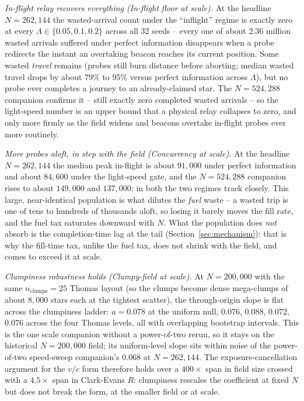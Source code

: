 \emph{In-flight relay recovers everything (In-flight floor at scale).} At the headline $N = 262{,}144$
the wasted-arrival count under the ``inflight'' regime is exactly zero at every
$\Lambda \in \{0.05, 0.1, 0.2\}$ across all 32 seeds -- every one of about 2.36 million wasted
arrivals suffered under perfect information disappears when a probe redirects the instant an
overtaking beacon reaches its current position. Some wasted \emph{travel} remains (probes still burn
distance before aborting; median wasted travel drops by about 79\% to 95\% versus perfect information
across $\Lambda$), but no probe ever completes a journey to an already-claimed star. The
$N = 524{,}288$ companion confirms it -- still exactly zero completed wasted arrivals -- so the
light-speed number is an upper bound that a physical relay collapses to zero, and only more firmly as
the field widens and beacons overtake in-flight probes ever more routinely.

\emph{More probes aloft, in step with the field (Concurrency at scale).} At the headline
$N = 262{,}144$ the median peak in-flight is about $91{,}000$ under perfect information and about
$84{,}600$ under the light-speed gate, and the $N = 524{,}288$ companion rises to about $149{,}000$
and $137{,}000$; in both the two regimes track closely. This large, near-identical population is what
dilutes the \emph{fuel} waste -- a wasted trip is one of tens to hundreds of thousands aloft, so
losing it barely moves the fill rate, and the fuel tax saturates downward with $N$. What the
population does \emph{not} absorb is the completion-time lag at the tail (Section~\ref{sec:mechanism}):
that is why the fill-time tax, unlike the fuel tax, does not shrink with the field, and comes to
exceed it at scale.

\emph{Clumpiness robustness holds (Clumpy-field at scale).} At $N = 200{,}000$ with the same
$n_{\text{clumps}} = 25$ Thomas layout (so the clumps become dense mega-clumps of about
$8{,}000$ stars each at the tightest scatter), the through-origin slope is flat across the
clumpiness ladder: $a = 0.078$ at the uniform null, $0.076$, $0.088$, $0.072$, $0.076$ across the
four Thomas levels, all with overlapping bootstrap intervals. This is the one scale companion without
a power-of-two rerun, so it stays on the historical $N = 200{,}000$ field; its uniform-level slope
sits within noise of the power-of-two speed-sweep companion's $0.068$ at $N = 262{,}144$. The
exposure-cancellation argument for the $v/c$ form therefore holds over a $400\times$ span in field
size crossed with a $4.5\times$ span in Clark-Evans $R$: clumpiness rescales the coefficient at fixed
$N$ but does not break the form, at the smaller field or at scale.

